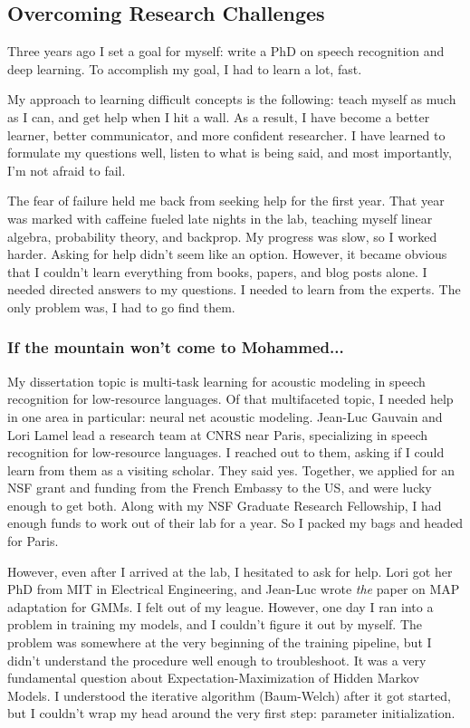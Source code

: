 \documentclass[12pt,a4paper]{article}
\begin{document}
\subsection*{Overcoming Research Challenges}

Three years ago I set a goal for myself: write a PhD on speech recognition and deep learning. To accomplish my goal, I had to learn a lot, fast.

My approach to learning difficult concepts is the following: teach myself as much as I can, and get help when I hit a wall. As a result, I have become a better learner, better communicator, and more confident researcher. I have learned to formulate my questions well, listen to what is being said, and most importantly, I'm not afraid to fail.

The fear of failure held me back from seeking help for the first year. That year was marked with caffeine fueled late nights in the lab, teaching myself linear algebra, probability theory, and backprop. My progress was slow, so I worked harder. Asking for help didn't seem like an option. However, it became obvious that I couldn't learn everything from books, papers, and blog posts alone. I needed directed answers to my questions. I needed to learn from the experts. The only problem was, I had to go find them.

\subsubsection*{If the mountain won't come to Mohammed...}

My dissertation topic is multi-task learning for acoustic modeling in speech recognition for low-resource languages. Of that multifaceted topic, I needed help in one area in particular: neural net acoustic modeling. Jean-Luc Gauvain and Lori Lamel lead a research team at CNRS near Paris, specializing in speech recognition for low-resource languages. I reached out to them, asking if I could learn from them as a visiting scholar. They said yes. Together, we applied for an NSF grant and funding from the French Embassy to the US, and were lucky enough to get both. Along with my NSF Graduate Research Fellowship, I had enough funds to work out of their lab for a year. So I packed my bags and headed for Paris.

However, even after I arrived at the lab, I hesitated to ask for help. Lori got her PhD from MIT in Electrical Engineering, and Jean-Luc wrote \textit{the} paper on MAP adaptation for GMMs. I felt out of my league. However, one day I ran into a problem in training my models, and I couldn't figure it out by myself. The problem was somewhere at the very beginning of the training pipeline, but I didn't understand the procedure well enough to troubleshoot. It was a very fundamental question about Expectation-Maximization of Hidden Markov Models. I understood the iterative algorithm (Baum-Welch) after it got started, but I couldn't wrap my head around the very first step: parameter initialization.
\end{document}
